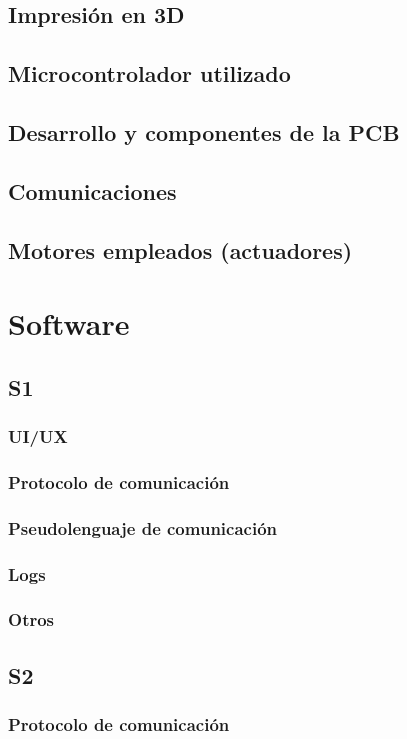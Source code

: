 \documentclass{article}
\begin{document}
\subsection{Impresión en 3D}
\subsection{Microcontrolador utilizado}
\subsection{Desarrollo y componentes de la PCB}
\subsection{Comunicaciones}
\subsection{Motores empleados (actuadores)}
\section{Software}
\subsection{S1}
\subsubsection{UI/UX}
\subsubsection{Protocolo de comunicación}
\subsubsection{Pseudolenguaje de comunicación}
\subsubsection{Logs}
\subsubsection{Otros}
\subsection{S2}
\subsubsection{Protocolo de comunicación}
\end{document}

